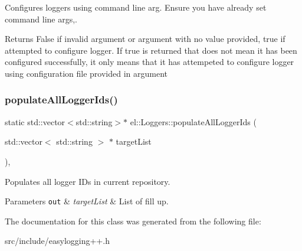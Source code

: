 Configures loggers using command line arg. Ensure you have already set command line args,. 

\begin{DoxyReturn}{Returns}
False if invalid argument or argument with no value provided, true if attempted to configure logger. If true is returned that does not mean it has been configured successfully, it only means that it has attempeted to configure logger using configuration file provided in argument 
\end{DoxyReturn}
\mbox{\label{classel_1_1_loggers_adea07ec6cbc1dfc50f939d69dcac7160}} 
\subsubsection{\texorpdfstring{populate\+All\+Logger\+Ids()}{populateAllLoggerIds()}}
{\footnotesize\ttfamily static std\+::vector$<$std\+::string$>$$\ast$ el\+::\+Loggers\+::populate\+All\+Logger\+Ids (\begin{DoxyParamCaption}\item[{std\+::vector$<$ std\+::string $>$ $\ast$}]{target\+List }\end{DoxyParamCaption})\hspace{0.3cm}{\ttfamily [inline]}, {\ttfamily [static]}}



Populates all logger I\+Ds in current repository. 


\begin{DoxyParams}[1]{Parameters}
\mbox{\tt out}  & {\em target\+List} & List of fill up. \\
\hline
\end{DoxyParams}


The documentation for this class was generated from the following file\+:\begin{DoxyCompactItemize}
\item 
src/include/easylogging++.\+h\end{DoxyCompactItemize}
